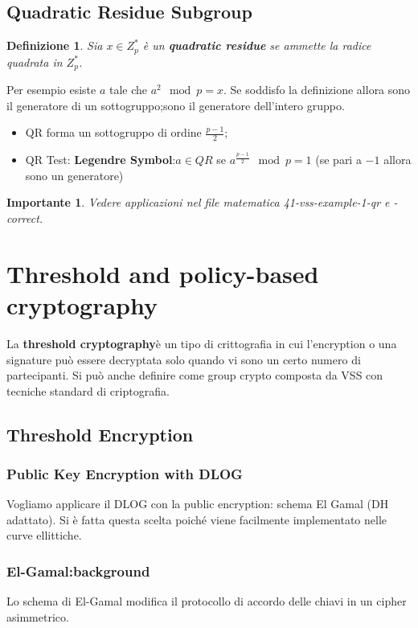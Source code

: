 \documentclass{book}
\newtheorem{Definizione}{\textbf{Definizione}}
\newtheorem*{Importante}{\textbf{Importante}}
\begin{document}
\section{Quadratic Residue Subgroup}
\begin{Definizione}
    Sia \(x\in Z_{p}^{*}\) è un \textbf{quadratic residue} se ammette la radice quadrata in \(Z_{p}^{*}\).
\end{Definizione}
Per esempio esiste \(a\) tale che \(a^{2}\mod{p}=x\).\newline
Se soddisfo la definizione allora sono il generatore di un sottogruppo;\@altrimenti sono il generatore dell'intero gruppo.
\begin{itemize}
    \item QR forma un sottogruppo di ordine \(\frac{p-1}{2}\);
    \item QR Test: \textbf{Legendre Symbol}:\(a\in QR\) se \(a^{\frac{p-1}{2}}\mod{p}=1\) (se pari a \(-1\) allora sono un generatore)
\end{itemize}
\begin{Importante}
    Vedere applicazioni nel file matematica 41-vss-example-1-qr e -correct.
\end{Importante}
\chapter{Threshold and policy-based cryptography}
La \textbf{threshold cryptography}è un tipo di crittografia in cui l'encryption o una signature può essere decryptata solo quando vi sono un certo numero di partecipanti. Si può anche definire come group crypto composta da VSS con tecniche standard di criptografia\@.
\section{Threshold Encryption}
\subsection{Public Key Encryption with DLOG}
Vogliamo applicare il DLOG con la public encryption: schema El Gamal (DH adattato)\@. Si è fatta questa scelta poiché viene facilmente implementato nelle curve ellittiche\@.
\subsection{El-Gamal:background}
Lo schema di El-Gamal modifica il protocollo di accordo delle chiavi in un cipher asimmetrico\@.
\end{document}
